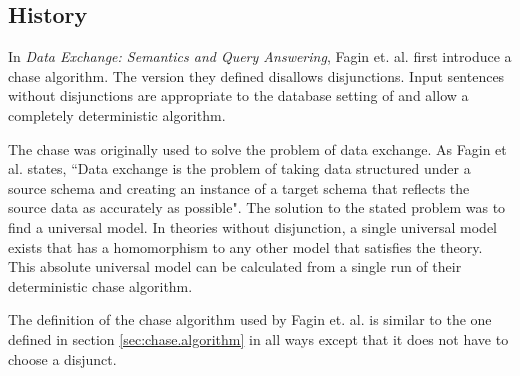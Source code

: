 	\subsection{History}

		In \cite{FKMP02} \emph{Data Exchange: Semantics and Query Answering},
		Fagin et. al. first introduce a chase algorithm. The version they
		defined disallows disjunctions. Input sentences without disjunctions
		are appropriate to the database setting of \cite{FKMP02} and allow a
		completely deterministic algorithm.

		The chase was originally used to solve the problem of data exchange. As
		Fagin et al. states, ``Data exchange is the problem of taking data
		structured under a source schema and creating an instance of a target
		schema that reflects the source data as accurately as possible". The
		solution to the stated problem was to find a universal model. In theories
		without disjunction, a single universal model exists that has a
		homomorphism to any other model that satisfies the theory. This
		absolute universal model can be calculated from a single run of their
		deterministic chase algorithm.

		The definition of the chase algorithm used by Fagin et. al. is similar
		to the one defined in section \ref{sec:chase.algorithm} in all ways
		except that it does not have to choose a disjunct.
